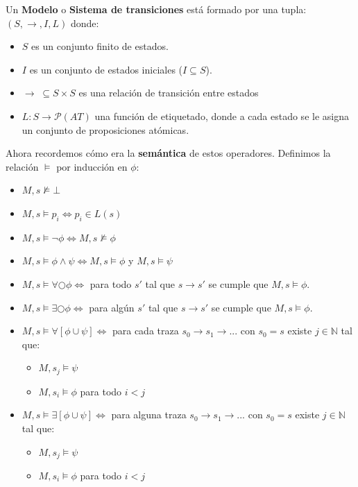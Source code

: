 \documentclass[11pt]{article}
\begin{document}
Un \textbf{Modelo} o \textbf{Sistema de transiciones} está formado por una tupla:
$(S, \rightarrow, I, L)$ donde:

\begin{itemize}
  \item $S$ es un conjunto finito de estados.
  \item $I$ es un conjunto de estados iniciales ($I \subseteq S$).
  \item $\rightarrow \; \subseteq S \times S$ es una relación de transición entre estados
  \item $L : S \rightarrow \mathcal{P}(AT)$ una función de etiquetado, donde a cada
        estado se le asigna un conjunto de proposiciones atómicas.
\end{itemize}

Ahora recordemos cómo era la \textbf{semántica} de estos operadores. Definimos 
la relación $\vDash$ por inducción en $\phi$:

\begin{itemize}
  \item $M,  s \nvDash \bot$
  \item $M, s \vDash p_i \iff p_i \in L(s)$
  \item $M, s \vDash \neg \phi \iff M, s \nvDash \phi$
  \item $M, s \vDash \phi \land \psi \iff M, s \vDash \phi $ y $M, s \vDash \psi$
  \item $M, s \vDash \forall \bigcirc \phi \iff $ para todo $s'$ tal que 
        $s \rightarrow s'$ se cumple que $M, s \vDash \phi$.
  \item $M, s \vDash \exists \bigcirc \phi \iff $ para algún $s'$ tal que
        $s \rightarrow s'$ se cumple que $M, s \vDash \phi$.
  \item $M, s \vDash \forall [\phi \cup \psi] \iff $ para cada traza
        $s_0 \rightarrow s_1 \rightarrow ...$ con $s_0 = s$ existe $j \in \mathbb{N}$
        tal que:
          \begin{itemize}
            \item $M, s_j \vDash \psi$
            \item $M, s_i \vDash \phi$ para todo $i < j$
          \end{itemize}
  \item $M, s \vDash \exists [\phi \cup \psi] \iff $ para alguna traza
        $s_0 \rightarrow s_1 \rightarrow ...$ con $s_0 = s$ existe $j \in \mathbb{N}$
        tal que:
          \begin{itemize}
            \item $M, s_j \vDash \psi$
            \item $M, s_i \vDash \phi$ para todo $i < j$
          \end{itemize}
\end{itemize}
\end{document}
